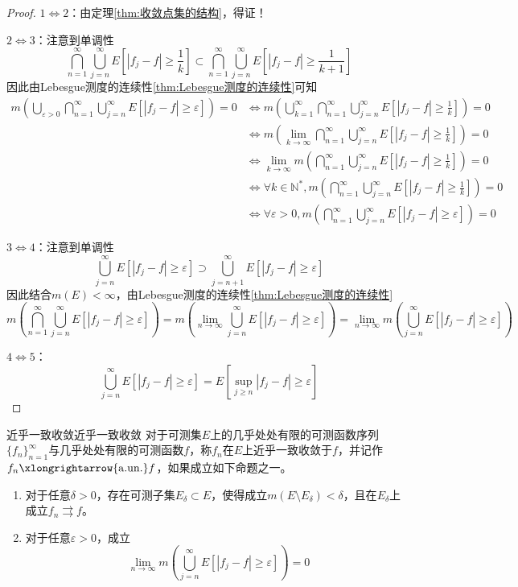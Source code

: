 \documentclass[lang = cn, scheme = chinese, thmcnt = section]{elegantbook}
\newcommand{\N}{\mathbb{N}}            %
\newcommand{\sub}{\subset}             %
\newcommand{\toaun}{\xlongrightarrow{\mathrm{a.un.}}}
\begin{document}
\begin{proof}
	$1\iff 2$：由定理\ref{thm:收敛点集的结构}，得证！
	
	$2\iff 3$：注意到单调性
	$$
	\bigcap_{n=1}^{\infty}\bigcup_{j=n}^{\infty}E\left[ |f_j-f|\ge \frac{1}{k} \right]\sub
	\bigcap_{n=1}^{\infty}\bigcup_{j=n}^{\infty}E\left[ |f_{j}-f|\ge \frac{1}{k+1} \right]
	$$
	因此由Lebesgue测度的连续性\ref{thm:Lebesgue测度的连续性}可知
	\begin{align*}
		m\left(\bigcup_{\varepsilon>0}\bigcap_{n=1}^{\infty}\bigcup_{j=n}^{\infty}E[ |f_j-f|\ge \varepsilon ]\right)=0
		& \iff m\left(\bigcup_{k=1}^{\infty}\bigcap_{n=1}^{\infty}\bigcup_{j=n}^{\infty}E\left[ |f_j-f|\ge \frac{1}{k} \right]\right)=0 \\
		& \iff m\left(\lim_{k\to\infty}\bigcap_{n=1}^{\infty}\bigcup_{j=n}^{\infty}E\left[ |f_j-f|\ge \frac{1}{k} \right]\right)=0 \\
		& \iff \lim_{k\to\infty}m\left(\bigcap_{n=1}^{\infty}\bigcup_{j=n}^{\infty}E\left[ |f_j-f|\ge \frac{1}{k} \right]\right)=0 \\
		& \iff \forall k\in\N^*, m\left(\bigcap_{n=1}^{\infty}\bigcup_{j=n}^{\infty}E\left[ |f_j-f|\ge \frac{1}{k} \right]\right)=0 \\
		& \iff \forall \varepsilon>0, m\left(\bigcap_{n=1}^{\infty}\bigcup_{j=n}^{\infty}E[|f_j-f|\ge \varepsilon]\right)=0
	\end{align*}
	
	$3\iff 4$：注意到单调性
	$$
	\bigcup_{j=n}^{\infty}E\left[ |f_j-f|\ge \varepsilon \right]\supset
	\bigcup_{j=n+1}^{\infty}E\left[ |f_{j}-f|\ge \varepsilon \right]
	$$
	因此结合$m(E)<\infty$，由Lebesgue测度的连续性\ref{thm:Lebesgue测度的连续性}%
	$$
	m\left(\bigcap_{n=1}^{\infty}\bigcup_{j=n}^{\infty}E[|f_j-f|\ge \varepsilon]\right)
	=m\left(\lim_{n\to\infty}\bigcup_{j=n}^{\infty}E[|f_j-f|\ge \varepsilon]\right)
	=\lim_{n\to\infty}m\left(\bigcup_{j=n}^{\infty}E[|f_j-f|\ge \varepsilon]\right)
	$$
	
	$4\iff 5$：
	$$
	\bigcup_{j=n}^{\infty}E[|f_j-f|\ge \varepsilon]
	=E\left[\sup_{j\ge n}|f_j-f|\ge \varepsilon\right]
	$$
\end{proof}

\begin{definition}{近乎一致收敛}{近乎一致收敛}
	对于可测集$E$上的几乎处处有限的可测函数序列$\{f_n\}_{n=1}^{\infty}$与几乎处处有限的可测函数$f$，称$f_n$在$E$上近乎一致收敛于$f$，并记作$f_n\toaun f$，如果成立如下命题之一。
	\begin{enumerate}
		\item 对于任意$\delta>0$，存在可测子集$E_\delta\sub E$，使得成立$m(E\setminus E_\delta)<\delta$，且在$E_\delta$上成立$f_n\rightrightarrows f$。
		\item 对于任意$\varepsilon> 0$，成立%
		$$
		\lim_{n\to\infty}m\left(\bigcup_{j=n}^{\infty}E[|f_j-f|\ge \varepsilon]\right)=0
		$$
	\end{enumerate}
\end{definition}
\end{document}
